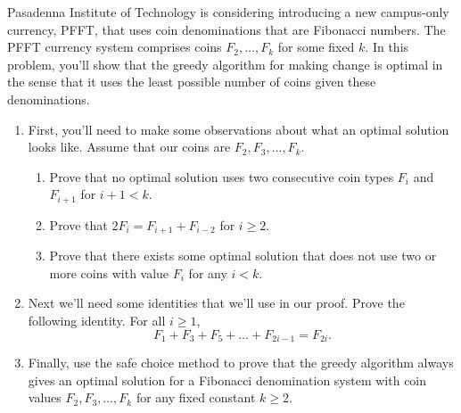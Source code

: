 \documentclass[12 pt, letterpaper]{hmcpset}
\begin{document}
\pagebreak

\begin{problem}
	Pasadenna Institute of Technology is considering introducing a new campus-only currency, PFFT, that uses coin denominations that are Fibonacci numbers. The PFFT currency system comprises coins $F_{2}, \dots, F_{k}$ for some fixed $k$. In this problem, you'll show that the greedy algorithm for making change is optimal in the sense that it uses the least possible number of coins given these denominations.

	\begin{enumerate}
		\item First, you'll need to make some observations about what an optimal solution looks like. Assume that our coins are $F_{2}, F_{3}, \dots, F_{k}$.
			\begin{enumerate}
				\item Prove that no optimal solution uses two consecutive coin types $F_{i}$ and $F_{i + 1}$ for $i + 1 < k$.

				\item Prove that  $2 F_{i} = F_{i + 1} + F_{i - 2}$ for $i \ge 2$.

				\item Prove that there exists some optimal solution that does not use two or more coins with value $F_{i}$ for any $i < k$.
			\end{enumerate}

		\item Next we'll need some identities that we'll use in our proof. Prove the following identity. For all $i \ge 1$,
			\[
				F_{1} + F_{3} + F_{5} + \dots + F_{2i - 1} = F_{2i}.
			\]

		\item Finally, use the safe choice method to prove that the greedy algorithm always gives an optimal solution for a Fibonacci denomination system with coin values $F_{2}, F_{3}, \dots, F_{k}$ for any fixed constant $k \ge 2$.
	\end{enumerate}
\end{problem}
\end{document}
